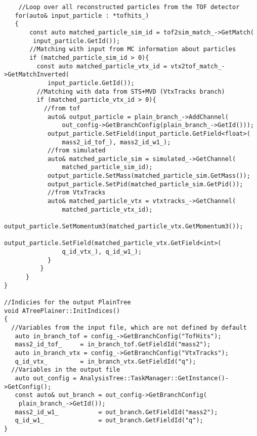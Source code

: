 \begin{lstlisting}
    //Loop over all reconstructed particles from the TOF detector
   for(auto& input_particle : *tofhits_)
   {
       const auto matched_particle_sim_id = tof2sim_match_->GetMatch(
        input_particle.GetId());
       //Matching with input from MC information about particles
       if (matched_particle_sim_id > 0){
         const auto matched_particle_vtx_id = vtx2tof_match_->GetMatchInverted(
            input_particle.GetId());
         //Matching with data from STS+MVD (VtxTracks branch)
         if (matched_particle_vtx_id > 0){
           //from tof
            auto& output_particle = plain_branch_->AddChannel(
                out_config->GetBranchConfig(plain_branch_->GetId()));
            output_particle.SetField(input_particle.GetField<float>(
                mass2_id_tof_), mass2_id_w1_);
            //from simulated
            auto& matched_particle_sim = simulated_->GetChannel(
                matched_particle_sim_id);
            output_particle.SetMass(matched_particle_sim.GetMass());
            output_particle.SetPid(matched_particle_sim.GetPid());
            //from VtxTracks
            auto& matched_particle_vtx = vtxtracks_->GetChannel(
                matched_particle_vtx_id);
            output_particle.SetMomentum3(matched_particle_vtx.GetMomentum3());
            output_particle.SetField(matched_particle_vtx.GetField<int>(
                q_id_vtx_), q_id_w1_);
            }
          }
      }
}

//Indicies for the output PlainTree
void ATreePlainer::InitIndices()
{
  //Variables from the input file, which are not defined by default
   auto in_branch_tof = config_->GetBranchConfig("TofHits");
   mass2_id_tof_     = in_branch_tof.GetFieldId("mass2");
   auto in_branch_vtx = config_->GetBranchConfig("VtxTracks");
   q_id_vtx_         = in_branch_vtx.GetFieldId("q");
  //Variables in the output file
   auto out_config = AnalysisTree::TaskManager::GetInstance()->GetConfig();
   const auto& out_branch = out_config->GetBranchConfig(
    plain_branch_->GetId());
   mass2_id_w1_           = out_branch.GetFieldId("mass2");
   q_id_w1_               = out_branch.GetFieldId("q");
}



\end{lstlisting}